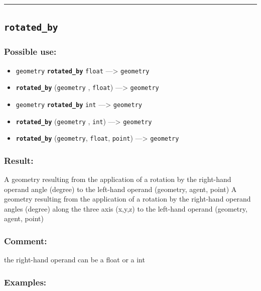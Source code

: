 \documentclass[]{book}
\providecommand{\tightlist}{%
  \setlength{\itemsep}{0pt}\setlength{\parskip}{0pt}}
\theoremstyle{definition}
\theoremstyle{definition}
\theoremstyle{definition}
\theoremstyle{remark}
\begin{document}
\begin{center}\rule{0.5\linewidth}{\linethickness}\end{center}

\subsection{\texorpdfstring{\texttt{rotated\_by}}{rotated\_by}}\label{rotated_by}

\subsubsection{Possible use:}\label{possible-use-444}

\begin{itemize}
\tightlist
\item
  \texttt{geometry} \textbf{\texttt{rotated\_by}} \texttt{float}
  ---\textgreater{} \texttt{geometry}
\item
  \textbf{\texttt{rotated\_by}} (\texttt{geometry} , \texttt{float})
  ---\textgreater{} \texttt{geometry}
\item
  \texttt{geometry} \textbf{\texttt{rotated\_by}} \texttt{int}
  ---\textgreater{} \texttt{geometry}
\item
  \textbf{\texttt{rotated\_by}} (\texttt{geometry} , \texttt{int})
  ---\textgreater{} \texttt{geometry}
\item
  \textbf{\texttt{rotated\_by}} (\texttt{geometry}, \texttt{float},
  \texttt{point}) ---\textgreater{} \texttt{geometry}
\end{itemize}

\subsubsection{Result:}\label{result-430}

A geometry resulting from the application of a rotation by the
right-hand operand angle (degree) to the left-hand operand (geometry,
agent, point) A geometry resulting from the application of a rotation by
the right-hand operand angles (degree) along the three axis (x,y,z) to
the left-hand operand (geometry, agent, point)

\subsubsection{Comment:}\label{comment-87}

the right-hand operand can be a float or a int

\subsubsection{Examples:}\label{examples-305}
\end{document}
